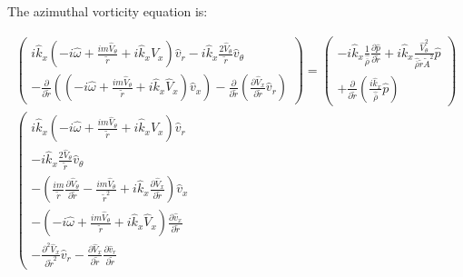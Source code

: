 The azimuthal vorticity equation is:

\begin{small}
\begin{eqnarray}
\left(
\begin{array}{r}
i \widehat{k}_x
\left(
-i \widehat{\omega} 
+ \frac{i m \widehat{V}_{\theta}}{\widetilde{r}}
+i \widehat{k}_x \widehat{V}_x 
\right) 
\widehat{v}_r 
-
i \widehat{k}_x
\frac{2 \widehat{V}_{\theta}}{\widetilde{r}} \widehat{v}_{\theta}
\\
-\frac{\partial}{\partial \widetilde{r}}
\left(
\left(
-i \widehat{\omega}
+ \frac{i m \widehat{V}_{\theta}}{\widetilde{r}}
+i \widehat{k}_x \widehat{V}_x 
\right) 
\widehat{v}_{x} 
\right)
-\frac{\partial}{\partial \widetilde{r}}
\left(
\frac{\partial \widehat{V}_x}{\partial \widetilde{r}} \widehat{v}_r
\right)
\end{array}
\right)
 = 
\left(
\begin{array}{r}
-
i \widehat{k}_x
\frac{1}{\widehat{\overline{\rho}}} \frac{\partial \widehat{p}}{\partial \widetilde{r}}
+
i \widehat{k}_x
\frac{\widehat{V}_{\theta}^2}{\widehat{\overline{\rho}} \widetilde{r} \widetilde{A}^2} 
\widehat{p}
\\
+\frac{\partial}{\partial \widetilde{r}}
\left(
\frac{i \widehat{k}_x}{\widehat{\overline{\rho}}} \widehat{p}
\right)
\end{array}
\right)
\nonumber
\\
\left(
\begin{array}{r}
i \widehat{k}_x
\left(
-i \widehat{\omega} 
+ \frac{i m \widehat{V}_{\theta}}{\widetilde{r}}
+i \widehat{k}_x \widehat{V}_x 
\right) 
\widehat{v}_r 
\\
-
i \widehat{k}_x
\frac{2 \widehat{V}_{\theta}}{\widetilde{r}} \widehat{v}_{\theta}
\\
-
\left(
\frac{i m}{\widetilde{r}}
\frac{\partial \widehat{V}_{\theta}
}{\partial \widetilde{r}}
- 
\frac{i m \widehat{V}_{\theta}}{\widetilde{r}^2}
+i \widehat{k}_x 
\frac{\partial
\widehat{V}_x 
}{\partial \widetilde{r}}
\right) 
\widehat{v}_{x} 
\\
-
\left(
-i \widehat{\omega}
+ \frac{i m \widehat{V}_{\theta}}{\widetilde{r}}
+i \widehat{k}_x \widehat{V}_x 
\right) 
\frac{\partial
\widehat{v}_{x} 
}{\partial \widetilde{r}}
\\
-
\frac{\partial^2 \widehat{V}_x}{\partial \widetilde{r}^2} \widehat{v}_r
-
\frac{\partial \widehat{V}_x}{\partial \widetilde{r}} 
\frac{\partial
\widehat{v}_r
}{\partial \widetilde{r}}
\end{array}

\end{eqnarray}
\end{small}

